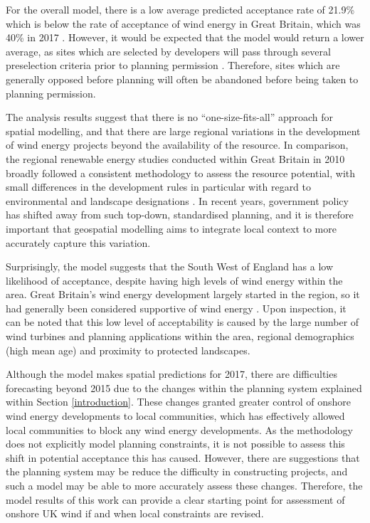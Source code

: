 \documentclass[a4paper,]{article}
\theoremstyle{definition}
\theoremstyle{definition}
\theoremstyle{definition}
\theoremstyle{remark}
\begin{document}
For the overall model, there is a low average predicted acceptance rate of 21.9\% which is below the rate of acceptance of wind energy in Great Britain, which was 40\% in 2017 \citep{DECC2018}. However, it would be expected that the model would return a lower average, as sites which are selected by developers will pass through several preselection criteria prior to planning permission \citep{Smith2016}. Therefore, sites which are generally opposed before planning will often be abandoned before being taken to planning permission.

The analysis results suggest that there is no ``one-size-fits-all'' approach for spatial modelling, and that there are large regional variations in the development of wind energy projects beyond the availability of the resource. In comparison, the regional renewable energy studies conducted within Great Britain in 2010 broadly followed a consistent methodology to assess the resource potential, with small differences in the development rules in particular with regard to environmental and landscape designations \citep{Stoddart2012}. In recent years, government policy has shifted away from such top-down, standardised planning, and it is therefore important that geospatial modelling aims to integrate local context to more accurately capture this variation.

Surprisingly, the model suggests that the South West of England has a low likelihood of acceptance, despite having high levels of wind energy within the area. Great Britain's wind energy development largely started in the region, so it had generally been considered supportive of wind energy \citep{Eltham2008}. Upon inspection, it can be noted that this low level of acceptability is caused by the large number of wind turbines and planning applications within the area, regional demographics (high mean age) and proximity to protected landscapes.

Although the model makes spatial predictions for 2017, there are difficulties forecasting beyond 2015 due to the changes within the planning system explained within Section \ref{introduction}. These changes granted greater control of onshore wind energy developments to local communities, which has effectively allowed local communities to block any wind energy developments. As the methodology does not explicitly model planning constraints, it is not possible to assess this shift in potential acceptance this has caused. However, there are suggestions that the planning system may be reduce the difficulty in constructing projects, and such a model may be able to more accurately assess these changes. Therefore, the model results of this work can provide a clear starting point for assessment of onshore UK wind if and when local constraints are revised.
\end{document}
